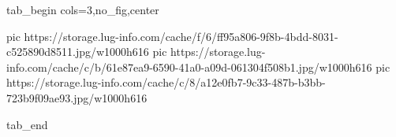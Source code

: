  
 
 
 
 


\ifcmt
  tab_begin cols=3,no_fig,center

     pic https://storage.lug-info.com/cache/f/6/ff95a806-9f8b-4bdd-8031-c525890d8511.jpg/w1000h616
		 pic https://storage.lug-info.com/cache/c/b/61e87ea9-6590-41a0-a09d-061304f508b1.jpg/w1000h616
		 pic https://storage.lug-info.com/cache/c/8/a12e0fb7-9c33-487b-b3bb-723b9f09ae93.jpg/w1000h616

  tab_end
\fi
